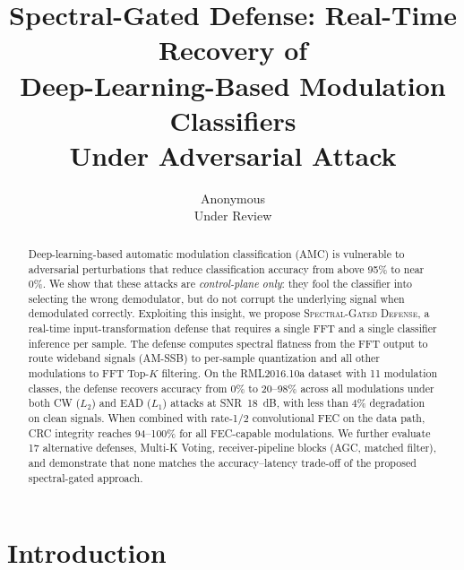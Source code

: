 \documentclass[letterpaper,twocolumn,10pt]{article}
\begin{document}

\date{}

\title{\Large \bf Spectral-Gated Defense: Real-Time Recovery of\\
Deep-Learning-Based Modulation Classifiers\\
Under Adversarial Attack}

\author{
{\rm Anonymous}\\
Under Review
}

\maketitle

\begin{abstract}
Deep-learning-based automatic modulation classification (AMC) is vulnerable to
adversarial perturbations that reduce classification accuracy from above 95\%
to near 0\%. We show that these attacks are \emph{control-plane only}: they
fool the classifier into selecting the wrong demodulator, but do not corrupt
the underlying signal when demodulated correctly. Exploiting this insight, we
propose \textsc{Spectral-Gated Defense}, a real-time input-transformation
defense that requires a single FFT and a single classifier inference per
sample. The defense computes spectral flatness from the FFT output to
route wideband signals (AM-SSB) to per-sample quantization and all other
modulations to FFT Top-$K$ filtering. On the RML2016.10a dataset with 11
modulation classes, the defense recovers accuracy from 0\% to 20--98\% across
all modulations under both CW ($L_2$) and EAD ($L_1$) attacks at SNR~18~dB,
with less than 4\% degradation on clean signals. When combined with rate-1/2
convolutional FEC on the data path, CRC integrity reaches 94--100\% for all
FEC-capable modulations. We further evaluate 17 alternative defenses,
Multi-K Voting, receiver-pipeline blocks (AGC, matched filter), and
demonstrate that none matches the accuracy--latency trade-off of the
proposed spectral-gated approach.
\end{abstract}

\section{Introduction}
\label{sec:intro}
\end{document}
